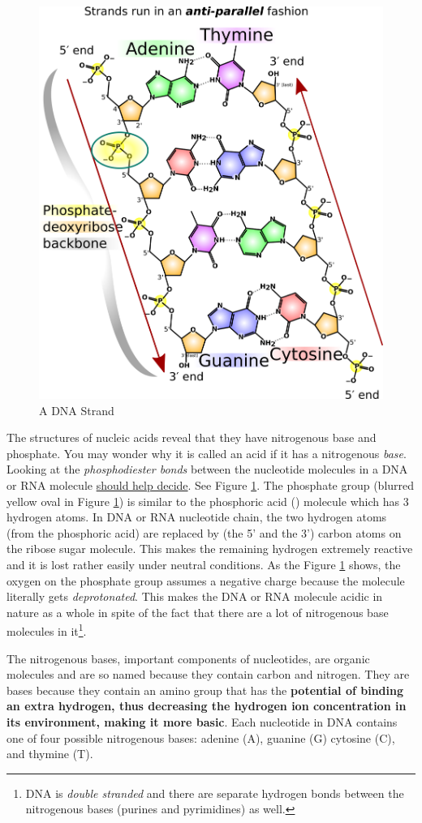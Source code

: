 \begin{figure}[ht!]
    \centering
    \includegraphics[width=0.6\linewidth]{DNA_chemical_structure-madprime.png}
    \caption{A DNA Strand}
    \label{fig: dna-strand}
\end{figure}


The structures of nucleic acids reveal that they have nitrogenous base and phosphate. You may wonder why it is called an acid if it has a nitrogenous \emph{base}. Looking at the \emph{phosphodiester bonds} between the nucleotide molecules in a DNA or RNA molecule \href{https://biology.stackexchange.com/questions/3864/dna-as-an-acid}{should help decide}. See Figure \ref{fig: dna-strand}. The phosphate group (blurred yellow oval in Figure \ref{fig: dna-strand}) is similar to the phosphoric acid () molecule which has 3 hydrogen atoms. In DNA or RNA nucleotide chain, the two hydrogen atoms (from the phosphoric acid) are replaced by (the 5' and the 3') carbon atoms on the ribose sugar molecule. This makes the remaining hydrogen extremely reactive and it is lost rather easily under neutral conditions. As the Figure \ref{fig: dna-strand} shows, the oxygen on the phosphate group assumes a negative charge because the molecule literally gets \emph{deprotonated}. This makes the DNA or RNA molecule acidic in nature as a whole in spite of the fact that there are a lot of nitrogenous base molecules in it\footnote{DNA is \emph{double stranded} and there are separate hydrogen bonds between the nitrogenous bases (purines and pyrimidines) as well.}.

The nitrogenous bases, important components of nucleotides, are organic molecules and are so named because they contain carbon and nitrogen. They are bases because they contain an amino group that has the \textbf{potential of binding an extra hydrogen, thus decreasing the hydrogen ion concentration in its environment, making it more basic}. Each nucleotide in DNA contains one of four possible nitrogenous bases: adenine (A), guanine (G) cytosine (C), and thymine (T).

